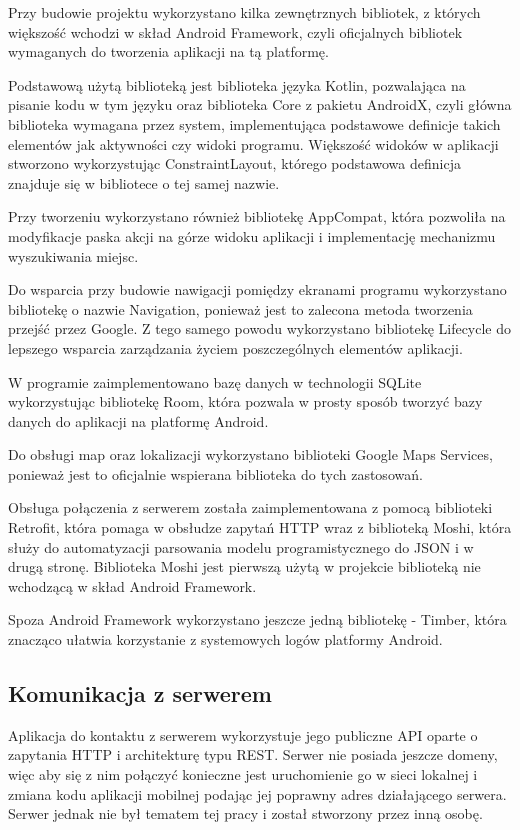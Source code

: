 \documentclass[polish,polish,a4paper,12pt]{article}
\begin{document}
	Przy budowie projektu wykorzystano kilka zewnętrznych bibliotek, z których większość wchodzi w skład Android Framework, czyli oficjalnych bibliotek wymaganych do tworzenia aplikacji na tą platformę.

	Podstawową użytą biblioteką jest biblioteka języka Kotlin, pozwalająca na pisanie kodu w tym języku oraz biblioteka Core z pakietu AndroidX, czyli główna biblioteka wymagana przez system, implementująca podstawowe definicje takich elementów jak aktywności czy widoki programu. Większość widoków w aplikacji stworzono wykorzystując ConstraintLayout, którego podstawowa definicja znajduje się w bibliotece o tej samej nazwie.

	Przy tworzeniu wykorzystano również bibliotekę AppCompat, która pozwoliła na modyfikacje paska akcji na górze widoku aplikacji i implementację mechanizmu wyszukiwania miejsc.

	Do wsparcia przy budowie nawigacji pomiędzy ekranami programu wykorzystano bibliotekę o nazwie Navigation, ponieważ jest to zalecona metoda tworzenia przejść przez Google. Z tego samego powodu wykorzystano bibliotekę Lifecycle do lepszego wsparcia zarządzania życiem poszczególnych elementów aplikacji.

	W programie zaimplementowano bazę danych w technologii SQLite wykorzystując bibliotekę Room, która pozwala w prosty sposób tworzyć bazy danych do aplikacji na platformę Android.

	Do obsługi map oraz lokalizacji wykorzystano biblioteki Google Maps Services, ponieważ jest to oficjalnie wspierana biblioteka do tych zastosowań.

	Obsługa połączenia z serwerem została zaimplementowana z pomocą biblioteki Retrofit, która pomaga w obsłudze zapytań HTTP wraz z biblioteką Moshi, która służy do automatyzacji parsowania modelu programistycznego do JSON i w drugą stronę. Biblioteka Moshi jest pierwszą użytą w projekcie biblioteką nie wchodzącą w skład Android Framework.

	Spoza Android Framework wykorzystano jeszcze jedną bibliotekę - Timber, która znacząco ułatwia korzystanie z systemowych logów platformy Android.

	\subsection{Komunikacja z serwerem}

	Aplikacja do kontaktu z serwerem wykorzystuje jego publiczne API oparte o zapytania HTTP i architekturę typu REST. Serwer nie posiada jeszcze domeny, więc aby się z nim połączyć konieczne jest uruchomienie go w sieci lokalnej i zmiana kodu aplikacji mobilnej podając jej poprawny adres działającego serwera. Serwer jednak nie był tematem tej pracy i został stworzony przez inną osobę.
\end{document}
